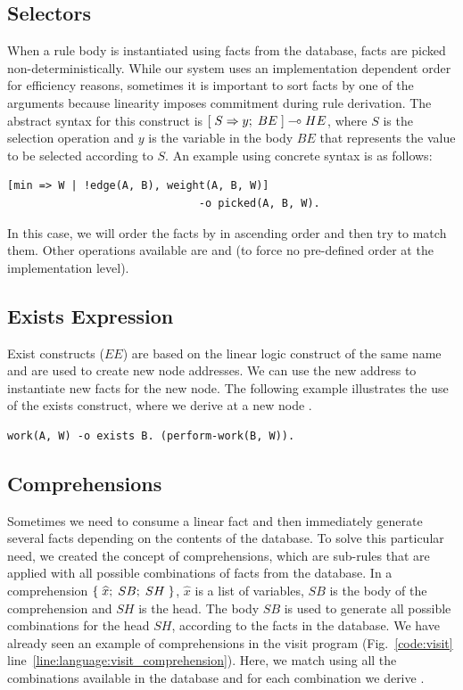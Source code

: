 \subsection{Selectors}

When a rule body is instantiated using facts from the database, facts are picked
non-deterministically. While our system uses an implementation dependent order
for efficiency reasons, sometimes it is important to sort facts by one of the
arguments because linearity imposes commitment during rule derivation. The
abstract syntax for this construct is $[\; S \Rightarrow y; \; BE \;] \multimap HE$, where $S$ is
the selection operation and $y$ is the variable in the body $BE$ that represents
the value to be selected according to $S$. An example using concrete syntax is
as follows:

\begin{Verbatim}[fontsize=\codesize]
[min => W | !edge(A, B), weight(A, B, W)]
                              -o picked(A, B, W).
\end{Verbatim}

In this case, we will order the  facts by  in ascending
order and then try to match them. Other operations available are 
and  (to force no pre-defined order at the implementation level).

\subsection{Exists Expression}

Exist constructs ($EE$) are based on the linear logic construct of the same name
and are used to create new node addresses. We can use the new address to
instantiate new facts for the new node.  The following example illustrates the
use of the exists construct, where we derive  at a new node
.

\begin{Verbatim}[fontsize=\codesize]
   work(A, W) -o exists B. (perform-work(B, W)).
\end{Verbatim}

\subsection{Comprehensions}

Sometimes we need to consume a linear fact and then immediately generate several
facts depending on the contents of the database. To solve this particular need,
we created the concept of comprehensions, which are sub-rules that are applied
with all possible combinations of facts from the database. In a comprehension
$\{ \; \widehat{x}; \; SB; \; SH \; \}$, $\widehat{x}$ is a list of variables,
$SB$ is the body of the comprehension and $SH$ is the head.  The body $SB$ is
used to generate all possible combinations for the head $SH$, according to the
facts in the database.  We have already seen an example of comprehensions in the
visit program (Fig.~\ref{code:visit}
line~\ref{line:language:visit_comprehension}). Here, we match  using all the combinations available in the database and for each
combination we derive .

